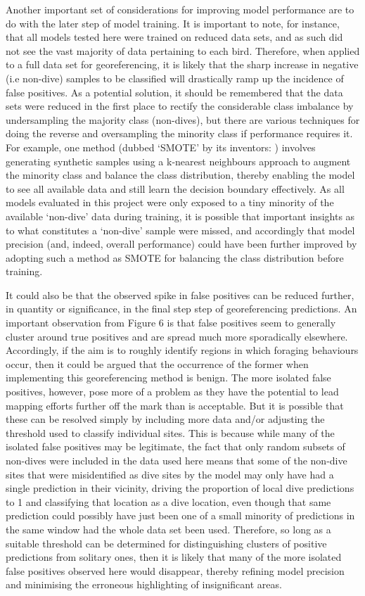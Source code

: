 \documentclass[11pt]{article}
\begin{document}
    Another important set of considerations for improving model performance are to do with the later step of model training. It is important to note, for instance, that all models tested here were trained on reduced data sets, and as such did not see the vast majority of data pertaining to each bird. Therefore, when applied to a full data set for georeferencing, it is likely that the sharp increase in negative (i.e non-dive) samples to be classified will drastically ramp up the incidence of false positives. As a potential solution, it should be remembered that the data sets were reduced in the first place to rectify the considerable class imbalance by undersampling the majority class (non-dives), but there are various techniques for doing the reverse and oversampling the minority class if performance requires it. For example, one method (dubbed ‘SMOTE’ by its inventors: \cite{chawla2002smote}) involves generating synthetic samples using a k-nearest neighbours approach to augment the minority class and balance the class distribution, thereby enabling the model to see all available data and still learn the decision boundary effectively. As all models evaluated in this project were only exposed to a tiny minority of the available ‘non-dive’ data during training, it is possible that important insights as to what constitutes a ‘non-dive’ sample were missed, and accordingly that model precision (and, indeed, overall performance) could have been further improved by adopting such a method as SMOTE for balancing the class distribution before training. 
    
    It could also be that the observed spike in false positives can be reduced further, in quantity or significance, in the final step step of georeferencing predictions. An important observation from Figure 6 is that false positives seem to generally cluster around true positives and are spread much more sporadically elsewhere. Accordingly, if the aim is to roughly identify regions in which foraging behaviours occur, then it could be argued that the occurrence of the former when implementing this georeferencing method is benign. The more isolated false positives, however, pose more of a problem as they have the potential to lead mapping efforts further off the mark than is acceptable. But it is possible that these can be resolved simply by including more data and/or adjusting the threshold used to classify individual sites. This is because while many of the isolated false positives may be legitimate, the fact that only random subsets of non-dives were included in the data used here means that some of the non-dive sites that were misidentified as dive sites by the model may only have had a single prediction in their vicinity, driving the proportion of local dive predictions to 1 and classifying that location as a dive location, even though that same prediction could possibly have just been one of a small minority of predictions in the same window had the whole data set been used. Therefore, so long as a suitable threshold can be determined for distinguishing clusters of positive predictions from solitary ones, then it is likely that many of the more isolated false positives observed here would disappear, thereby refining model precision and minimising the erroneous highlighting of insignificant areas.
    
\end{document}
